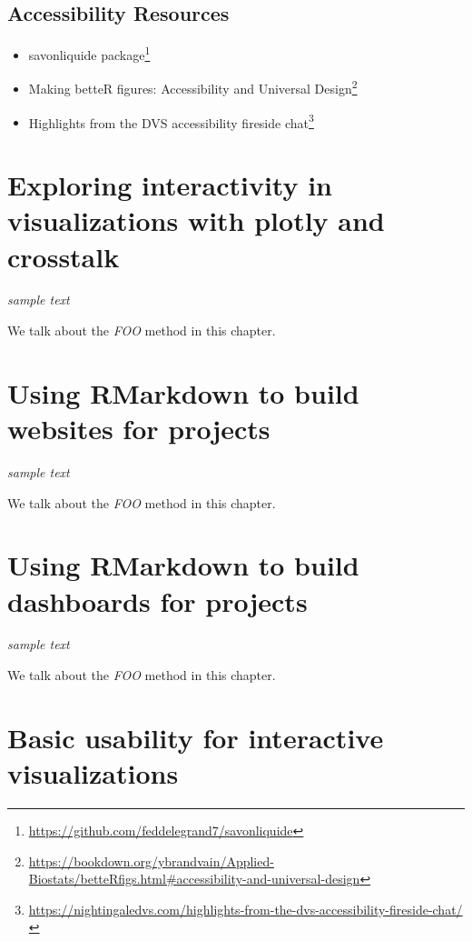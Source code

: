 \documentclass[
]{krantz}
\renewcommand{\href}[2]{#2\footnote{\url{#1}}}
\begin{document}
\hypertarget{accessibility-resources}{%
\section{Accessibility Resources}\label{accessibility-resources}}

\begin{itemize}
\item
  \href{https://github.com/feddelegrand7/savonliquide}{savonliquide package}
\item
  \href{https://bookdown.org/ybrandvain/Applied-Biostats/betteRfigs.html\#accessibility-and-universal-design}{Making betteR figures: Accessibility and Universal Design}
\item
  \href{https://nightingaledvs.com/highlights-from-the-dvs-accessibility-fireside-chat/}{Highlights from the DVS accessibility fireside chat}
\end{itemize}

\hypertarget{interactive-visualizations}{%
\chapter{Exploring interactivity in visualizations with plotly and crosstalk}\label{interactive-visualizations}}

\emph{sample text}

We talk about the \emph{FOO} method in this chapter.

\hypertarget{rmarkdown-websites}{%
\chapter{Using RMarkdown to build websites for projects}\label{rmarkdown-websites}}

\emph{sample text}

We talk about the \emph{FOO} method in this chapter.

\hypertarget{rmarkdown-dashboards}{%
\chapter{Using RMarkdown to build dashboards for projects}\label{rmarkdown-dashboards}}

\emph{sample text}

We talk about the \emph{FOO} method in this chapter.

\hypertarget{usability-for-visualizations}{%
\chapter{Basic usability for interactive visualizations}\label{usability-for-visualizations}}
\end{document}
